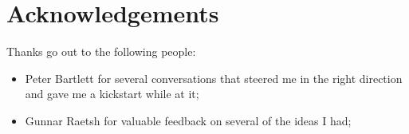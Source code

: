 
\chapter{Acknowledgements}

Thanks go out to the following people:

\begin{itemize}

\item	Peter Bartlett for several conversations that steered me in
	the right direction and gave me a kickstart while at it;

\item	Gunnar Raetsh for valuable feedback on several of the ideas I
	had;

\end{itemize}

